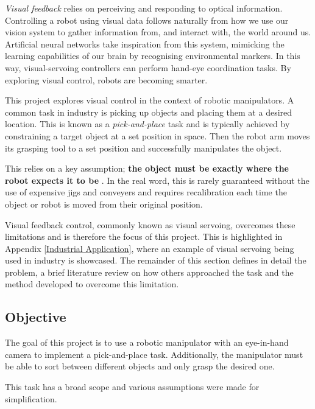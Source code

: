 \documentclass{UoNMCHA}
\numberwithin{equation}{section}
\begin{document}
\textit{Visual feedback} relies on perceiving and responding to optical information. Controlling a robot using visual data follows naturally from how we use our vision system to gather information from, and interact with, the world around us. Artificial neural networks take inspiration from this system, mimicking the learning capabilities of our brain by recognising environmental markers. In this way, visual-servoing controllers can perform hand-eye coordination tasks. By exploring visual control, robots are becoming smarter. \

This project explores visual control in the context of robotic manipulators. A common task in industry is picking up objects and placing them at a desired location. This is known as a \textit{pick-and-place} task and is typically achieved by constraining a target object at a set position in space. Then the robot arm moves its grasping tool to a set position and successfully manipulates the object. \

This relies on a key assumption; \textbf{the object must be exactly where the robot expects it to be} \citep{corke2017robotics}. In the real word, this is rarely guaranteed without the use of expensive jigs and conveyers and requires recalibration each time the object or robot is moved from their original position. \

Visual feedback control, commonly known as visual servoing, overcomes these limitations and is therefore the focus of this project. This is highlighted in Appendix \ref{Industrial Application}, where an example of visual servoing being used in industry is showcased. The remainder of this section defines in detail the problem, a brief literature review on how others approached the task and the method developed to overcome this limitation. 

    
    
    \subsection{Objective}\label{Objective}
    
   The goal of this project is to use a robotic manipulator with an eye-in-hand camera to implement a pick-and-place task. Additionally, the manipulator must be able to sort between different objects and only grasp the desired one.\
	
	This task has a broad scope and various assumptions were made for simplification.
	
\end{document}
